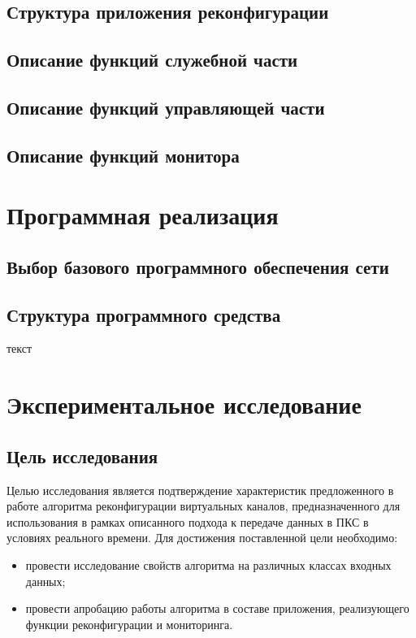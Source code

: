 \documentclass[12pt,fleqn]{article}
\begin{document}
\subsection{Структура приложения реконфигурации}
\subsection{Описание функций служебной части}
\subsection{Описание функций управляющей части}
\subsection{Описание функций монитора}


\section{Программная реализация}
\subsection{Выбор базового программного обеспечения сети}
\subsection{Структура программного средства}
текст


\section{Экспериментальное исследование}
\subsection{Цель исследования}
Целью исследования является подтверждение характеристик предложенного в работе алгоритма реконфигурации виртуальных каналов, предназначенного для использования в рамках описанного подхода к передаче данных в ПКС в условиях реального времени. Для достижения поставленной цели необходимо:
\begin{itemize}
	\item провести исследование свойств алгоритма на различных классах входных данных; 
	\item провести апробацию работы алгоритма в составе приложения, реализующего функции реконфигурации и мониторинга.
\end{itemize}
\end{document}
